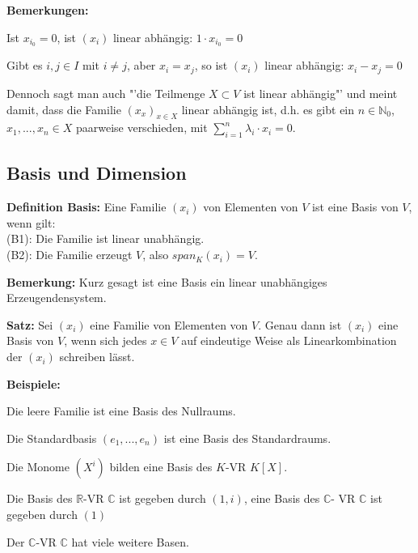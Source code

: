 \documentclass[11pt]{article}
\begin{document}
		\textbf{Bemerkungen:}
		\begin{compactitem}
			\item Ist $x_{i_0}=0$, ist $(x_i)$ linear abhängig: $1\cdot x_{i_0}=0$
			\item Gibt es $i,j\in I$ mit $i\neq j$, aber $x_i=x_j$, so ist $(x_i)$ linear abhängig: $x_i-x_j=0$
			\item Dennoch sagt man auch "'die Teilmenge $X\subset V$ ist linear abhängig"' und meint damit, dass die Familie $(x_x)
			_{x\in X}$ linear abhängig ist, d.h. es gibt ein $n\in \mathbb N_0$, $x_1,...,x_n \in X$ paarweise verschieden, mit 
			$\sum\limits_{i=1}^n \lambda_i\cdot x_i=0$.
		\end{compactitem}
		
	\subsection{Basis und Dimension}
		\begin{mdframed}[backgroundcolor=blue!20]
			\textbf{Definition Basis:} Eine Familie $(x_i)$ von Elementen von $V$ ist eine Basis von $V$, wenn gilt: \\
			(B1): Die Familie ist linear unabhängig. \\
			(B2): Die Familie erzeugt $V$, also $span_K(x_i) = V$.
		\end{mdframed}
		
		\textbf{Bemerkung:} Kurz gesagt ist eine Basis ein linear unabhängiges Erzeugendensystem. \\
		
		\begin{framed}
			\textbf{Satz:} Sei $(x_i)$ eine Familie von Elementen von $V$. Genau dann ist $(x_i)$ eine Basis von $V$, 
			wenn sich jedes $x \in V$ auf eindeutige Weise als Linearkombination der $(x_i)$ schreiben lässt.
		\end{framed}
		
		\textbf{Beispiele:}
		\begin{compactitem}
			\item Die leere Familie ist eine Basis des Nullraums.
			\item Die Standardbasis $(e_1,...,e_n)$ ist eine Basis des Standardraums.
			\item Die Monome $(X^i)$ bilden eine Basis des $K$-VR $K[X]$.
			\item Die Basis des $\mathbb R$-VR $\mathbb C$ ist gegeben durch $(1,i)$, eine Basis des $\mathbb C$-
			VR $\mathbb C$ ist gegeben durch $(1)$
			\item Der $\mathbb C$-VR $\mathbb C$ hat viele weitere Basen.
		\end{compactitem}
		
\end{document}
